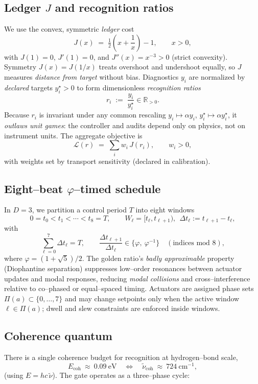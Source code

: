 \documentclass[11pt]{article}
\begin{document}
\subsection{Ledger $J$ and recognition ratios}
We use the convex, symmetric \emph{ledger} cost
\[
J(x)\;=\;\tfrac12\!\left(x+\frac{1}{x}\right)-1,\qquad x>0,
\]
with $J(1)=0$, $J'(1)=0$, and $J''(x)=x^{-3}>0$ (strict convexity). Symmetry $J(x)=J(1/x)$ treats overshoot and undershoot equally, so $J$ measures \emph{distance from target} without bias. Diagnostics $y_i$ are normalized by \emph{declared} targets $y_i^\star>0$ to form dimensionless \emph{recognition ratios}
\[
r_i\;:=\; \frac{y_i}{y_i^\star}\in\mathbb{R}_{>0}.
\]
Because $r_i$ is invariant under any common rescaling $y_i\mapsto \alpha y_i$, $y_i^\star\mapsto \alpha y_i^\star$, it \emph{outlaws unit games}: the controller and audits depend only on physics, not on instrument units. The aggregate objective is
\[
\mathcal{L}(r)\;=\;\sum_i w_i\,J(r_i),\qquad w_i>0,
\]
with weights set by transport sensitivity (declared in calibration).

\subsection{Eight--beat $\varphi$--timed schedule}
In $D{=}3$, we partition a control period $T$ into eight windows
\[
0=t_0<t_1<\cdots<t_8=T,\qquad W_\ell=[t_\ell,t_{\ell+1}),\ \ \Delta t_\ell:=t_{\ell+1}-t_\ell,
\]
with
\[
\sum_{\ell=0}^{7}\Delta t_\ell=T,\qquad 
\frac{\Delta t_{\ell+1}}{\Delta t_\ell}\in\{\varphi,\ \varphi^{-1}\}\quad(\text{indices mod }8),
\]
where $\varphi=(1+\sqrt{5})/2$. The golden ratio’s \emph{badly approximable} property (Diophantine separation) suppresses low–order resonances between actuator updates and modal responses, reducing \emph{modal collisions} and cross–interference relative to co–phased or equal–spaced timing. Actuators are assigned phase sets $\Pi(a)\subset\{0,\dots,7\}$ and may change setpoints only when the active window $\ell\in\Pi(a)$; dwell and slew constraints are enforced inside windows.

\subsection{Coherence quantum}
There is a single coherence budget for recognition at hydrogen–bond scale,
\[
E_{\mathrm{coh}}\ \approx\ 0.09~\mathrm{eV}
\quad\Longleftrightarrow\quad
\tilde\nu_{\mathrm{coh}}\ \approx\ 724~\mathrm{cm^{-1}},
\]
(using $E=h c\,\tilde\nu$). The gate operates as a three–phase cycle:
\end{document}
